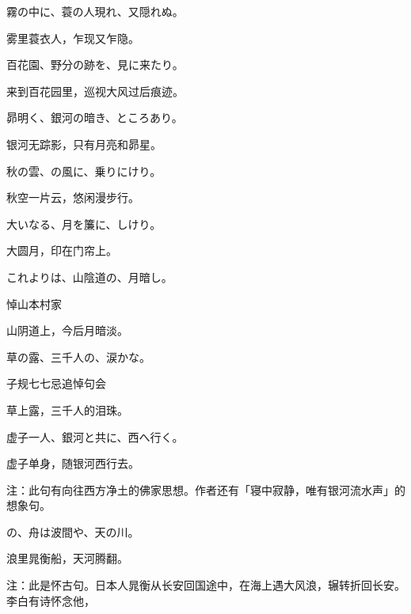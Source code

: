 \begin{haiku}
    {\FH 霧の中に、蓑の人現れ、又隠れぬ。}

    {\FK 雾里蓑衣人，乍现又乍隐。}
\end{haiku}

\begin{haiku}
    {\FH 百花園、野分の跡を、見に来たり。}

    {\FK 来到百花园里，巡视大风过后痕迹。}
\end{haiku}

\begin{haiku}
    {\FH 昴明く、銀河の暗き、ところあり。}

    {\FK 银河无踪影，只有月亮和昴星。}
\end{haiku}

\begin{haiku}
    {\FH 秋の雲、の風に、乗りにけり。}

    {\FK 秋空一片云，悠闲漫步行。}
\end{haiku}

\begin{haiku}
    {\FH 大いなる、月を簾に、しけり。}

    {\FK 大圆月，印在门帘上。}
\end{haiku}

\begin{haiku}
    {\FH これよりは、山陰道の、月暗し。}

    {\FK 悼山本村家}

    {\FK 山阴道上，今后月暗淡。}
\end{haiku}

\begin{haiku}
    {\FH 草の露、三千人の、涙かな。}

    {\FK 子规七七忌追悼句会}

    {\FK 草上露，三千人的泪珠。}
\end{haiku}

\begin{haiku}
    {\FH 虚子一人、銀河と共に、西へ行く。}

    {\FK 虚子单身，随银河西行去。}

    {\FT 注：此句有向往西方净土的佛家思想。作者还有「寝中寂静，唯有银河流水声」的想象句。}
\end{haiku}

\begin{haiku}
    {\FH {}の、舟は波間や、天の川。}

    {\FK 浪里晁衡船，天河腾翻。}

    {\FT 注：此是怀古句。日本人晁衡从长安回国途中，在海上遇大风浪，辗转折回长安。李白有诗怀念他，}
\end{haiku}

